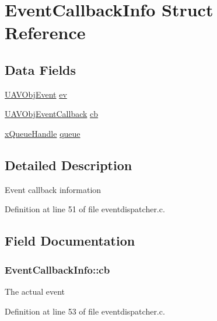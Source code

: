 \hypertarget{struct_event_callback_info}{\section{Event\-Callback\-Info Struct Reference}
\label{struct_event_callback_info}
}
\subsection*{Data Fields}
\begin{DoxyCompactItemize}
\item 
\hyperlink{struct_u_a_v_obj_event}{U\-A\-V\-Obj\-Event} \hyperlink{struct_event_callback_info_a437283aa345859ce2746a744069f63a5}{ev}
\item 
\hyperlink{group___u_a_v_ga33d11560e38b56dc904220fb0f785c28}{U\-A\-V\-Obj\-Event\-Callback} \hyperlink{struct_event_callback_info_aede25eb5852126792f5a9da9b084a32f}{cb}
\item 
\hyperlink{_common_2_libraries_2_free_r_t_o_s_2_source_2include_2queue_8h_a229037f755b756156e34a440ce134b8b}{x\-Queue\-Handle} \hyperlink{struct_event_callback_info_a4caebba9d1c6e9e5e4c7194cec8c60a3}{queue}
\end{DoxyCompactItemize}


\subsection{Detailed Description}
Event callback information 

Definition at line 51 of file eventdispatcher.\-c.



\subsection{Field Documentation}
\hypertarget{struct_event_callback_info_aede25eb5852126792f5a9da9b084a32f}{
\subsubsection[{cb}]{ Event\-Callback\-Info\-::cb}}\label{struct_event_callback_info_aede25eb5852126792f5a9da9b084a32f}
The actual event 

Definition at line 53 of file eventdispatcher.\-c.

